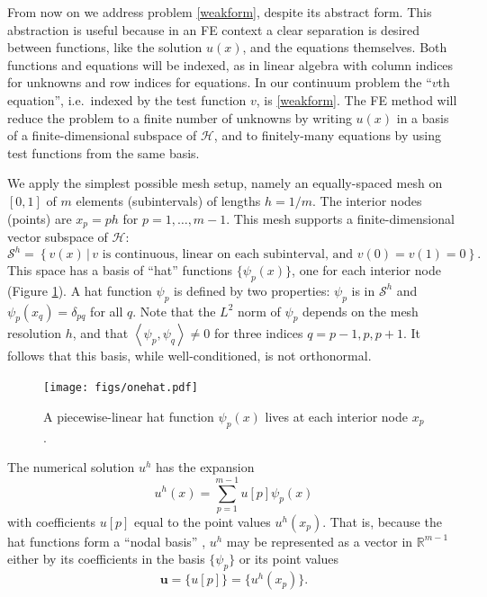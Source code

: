 \documentclass[letterpaper,final,12pt,reqno]{amsart}
\newcommand{\RR}{\mathbb{R}}
\newcommand{\bu}{\mathbf{u}}
\newcommand{\ip}[2]{\left<#1,#2\right>}
\begin{document}
From now on we address problem \eqref{weakform}, despite its abstract form.  This abstraction is useful because in an FE context a clear separation is desired between functions, like the solution $u(x)$, and the equations themselves.  Both functions and equations will be indexed, as in linear algebra with column indices for unknowns and row indices for equations.  In our continuum problem the ``$v$th equation'', i.e.~indexed by the test function $v$, is \eqref{weakform}.  The FE method will reduce the problem to a finite number of unknowns by writing $u(x)$ in a basis of a finite-dimensional subspace of $\mathcal{H}$, and to finitely-many equations by using test functions from the same basis.

We apply the simplest possible mesh setup, namely an equally-spaced mesh on $[0,1]$ of $m$ elements (subintervals) of lengths $h=1/m$.  The interior nodes (points) are $x_p=ph$ for $p=1,\dots,m-1$.  This mesh supports a finite-dimensional vector subspace of $\mathcal{H}$:
\begin{equation}
\mathcal{S}^h = \left\{v(x)\,\big|\,v \text{ is continuous, linear on each subinterval, and } v(0)=v(1)=0\right\}.  \label{fespace}
\end{equation}
This space has a basis of ``hat'' functions $\{\psi_p(x)\}$, one for each interior node (Figure \ref{fig:onehat}).  A hat function $\psi_p$ is defined by two properties: $\psi_p$ is in $\mathcal{S}^h$ and $\psi_p(x_q)=\delta_{pq}$ for all $q$.  Note that the $L^2$ norm of $\psi_p$ depends on the mesh resolution $h$, and that $\ip{\psi_p}{\psi_q}\ne 0$ for three indices $q=p-1,p,p+1$.  It follows that this basis, while well-conditioned, is not orthonormal.

\begin{figure}
\texttt{[image: figs/onehat.pdf]}
\caption{A piecewise-linear hat function $\psi_p(x)$ lives at each interior node $x_p$.}
\label{fig:onehat}
\end{figure}

The numerical solution $u^h$ has the expansion
\begin{equation}
  u^h(x) = \sum_{p=1}^{m-1} u[p] \psi_p(x)  \label{fesolution}
\end{equation}
with coefficients $u[p]$ equal to the point values $u^h(x_p)$.  That is, because the hat functions form a ``nodal basis'' \cite{Elmanetal2014}, $u^h$ may be represented as a vector in $\RR^{m-1}$ either by its coefficients in the basis $\{\psi_p\}$ or its point values
\begin{equation}
\bu =\{u[p]\} = \{u^h(x_p)\}.  \label{fevector}
\end{equation}
\end{document}
